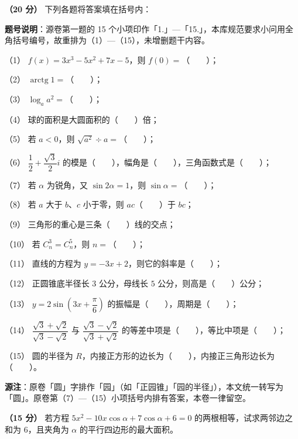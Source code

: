 \begin{question}
\textbf{（20 分）} 下列各题将答案填在括号内：

\begin{gktip}
\textbf{题号说明}：源卷第一题的 15 个小项印作「1.」—「15.」，本库规范要求小问用全角括号编号，故重排为（1）—（15），未增删题干内容。
\end{gktip}

（1） $f(x)=3x^3-5x^2+7x-5$，则 $f(0)=$\mbox{（　　）}；

（2） $\operatorname{arctg}1=$\mbox{（　　）}；

（3） $\log_a a^2=$\mbox{（　　）}；

（4） 球的面积是大圆面积的\mbox{（　　）}倍；

（5） 若 $a<0$，则 $\sqrt{a^2}\div a=$\mbox{（　　）}；

（6） $\dfrac12+\dfrac{\sqrt3}{2}i$ 的模是\mbox{（　　）}，幅角是\mbox{（　　）}，三角函数式是\mbox{（　　）}；

（7） 若 $\alpha$ 为锐角，又 $\sin 2\alpha=1$，则 $\sin\alpha=$\mbox{（　　）}；

（8） 若 $a$ 大于 $b$、$c$ 小于零，则 $ac$\mbox{（　　）}于 $bc$；

（9） 三角形的重心是三条\mbox{（　　）}线的交点；

（10） 若 $C_n^3=C_n^5$，则 $n=$\mbox{（　　）}；

（11） 直线的方程为 $y=-3x+2$，则它的斜率是\mbox{（　　）}；

（12） 正圆锥底半径长 $3$ 公分，母线长 $5$ 公分，则高是\mbox{（　　）}公分；

（13） $y=2\sin\left(3x+\dfrac{\pi}{6}\right)$ 的振幅是\mbox{（　　）}，周期是\mbox{（　　）}；

（14） $\dfrac{\sqrt3+\sqrt2}{\sqrt3-\sqrt2}$ 与 $\dfrac{\sqrt3-\sqrt2}{\sqrt3+\sqrt2}$ 的等差中项是\mbox{（　　）}，等比中项是\mbox{（　　）}；

（15） 圆的半径为 $R$，内接正方形的边长为\mbox{（　　）}，内接正三角形边长为\mbox{（　　）}。

\begin{gktip}
\textbf{源注}：原卷「圆」字排作「园」（如「正园锥」「园的半径」），本文统一转写为「圆」。原卷第（7）—（15）小项括号内排有答案，本卷一律留空。
\end{gktip}

\end{question}
\begin{question}
\textbf{（15 分）} 若方程 $5x^2-10x\cos\alpha+7\cos\alpha+6=0$ 的两根相等，试求两邻边之和为 $6$，且夹角为 $\alpha$ 的平行四边形的最大面积。

\end{question}
